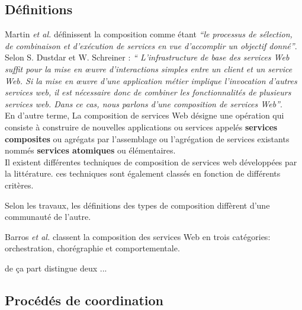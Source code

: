   \subsection{Définitions}
    \label{sec:definitions}

    Martin \emph{et al.} \cite{martin2004owl} définissent
    la composition comme étant \emph{``le processus de sélection, de
      combinaison et d'exécution de services en vue
      d'accomplir un objectif donné''}.\\
  
    Selon S. Dustdar et W. Schreiner \cite{dustdar2005survey} :
    \emph{`` L'infrastructure de base des services Web suffit pour la
      mise en œuvre d'interactions simples entre un client et un
      service Web. Si la mise en œuvre d'une application métier
      implique l'invocation d'autres services web, il est nécessaire
      donc de combiner les fonctionnalités de plusieurs services
      web. Dans ce cas, nous parlons d'une composition de services
      Web''}.\\
    
    En d'autre terme, La composition de services Web désigne une
    opération qui consiste à construire de nouvelles applications ou
    services appelés \textbf{services composites} ou agrégats par
    l'assemblage ou l'agrégation de services existants nommés
    \textbf{services atomiques} ou
    élémentaires.\\

    Il existent différentes techniques de composition de services web
    développées par la littérature. ces techniques sont également
    classés en fonction de différents critères.

    Selon les travaux, les définitions des types de composition
    diffèrent d'une communauté de l'autre.

    Barros \emph{et al.} \cite{barros2006standards} classent la
    composition des services Web en trois catégories: orchestration,
    chorégraphie et comportementale.

    \cite{peltz2003web} de ça part distingue deux ...


      \subsection{Procédés de coordination}
      \label{sec:proc-de-coord}

